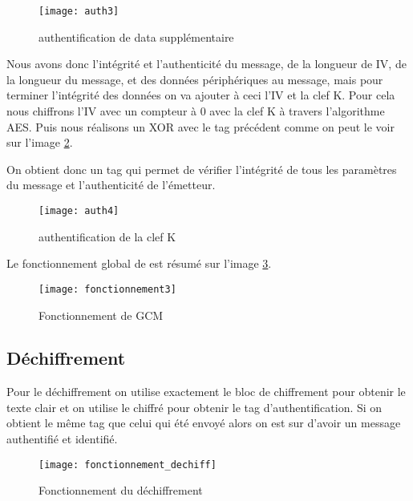 \begin{figure}[!h]
  \centering
  \texttt{[image: auth3]}
  \caption{authentification de data supplémentaire}
  \label{auth3}
\end{figure}



Nous avons donc l'intégrité et l'authenticité du message, de la longueur de IV, de la longueur du message, et des données périphériques au message, mais pour terminer l'intégrité des données on va ajouter à ceci l'IV et la clef K. %
Pour cela nous chiffrons l'IV avec un compteur à 0 avec la clef K à travers l'algorithme AES. Puis nous réalisons un XOR avec le tag précédent comme on peut le voir sur l'image \ref{auth4}.

On obtient donc un tag qui permet de vérifier l'intégrité de tous les paramètres du message et l'authenticité de l'émetteur.

\begin{figure}[!h]
  \centering
  \texttt{[image: auth4]}
  \caption{authentification de la clef K}
  \label{auth4}
\end{figure}


Le fonctionnement global de \aes est résumé sur l'image \ref{Fonctionnement de GCM}.


\begin{figure}[!h]
  \centering
  \texttt{[image: fonctionnement3]}
  \caption{Fonctionnement de GCM}
  \label{Fonctionnement de GCM}
\end{figure}

\newpage
\subsection{Déchiffrement}

Pour le déchiffrement on utilise exactement le bloc de chiffrement pour obtenir le texte clair et on utilise le chiffré pour obtenir le tag d'authentification. Si on obtient le même tag que celui qui été envoyé alors on est sur d'avoir un message authentifié et identifié.

\begin{figure}[!h]
  \centering
  \texttt{[image: fonctionnement\_dechiff]}
  \caption{Fonctionnement du déchiffrement}
  \label{Fonctionnement du dechiff}
\end{figure}



